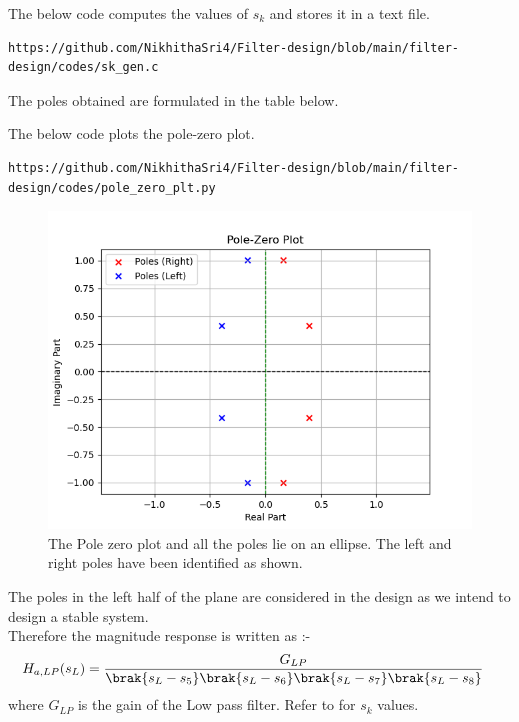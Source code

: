 \documentclass{article}
\begin{document}
\begin{enumerate}
The below code computes the values of $s_k$ and stores it in a text file. 
\begin{lstlisting}
https://github.com/NikhithaSri4/Filter-design/blob/main/filter-design/codes/sk_gen.c
\end{lstlisting}
The poles obtained are formulated in the table below.

The below code plots the pole-zero plot.
\begin{lstlisting}
https://github.com/NikhithaSri4/Filter-design/blob/main/filter-design/codes/pole_zero_plt.py
\end{lstlisting}
\begin{figure}[H]
\centering
\includegraphics[width=1\columnwidth]{figs/Pole_Zero_plt.png}
\caption{The Pole zero plot and all the poles lie on an ellipse. The left and right poles have been identified as shown.}
\label{fig:pole_zero_plt}
\end{figure}
The poles in the left half of the plane are considered in the design as we intend to design a stable system.\\
Therefore the magnitude response is written as :- 
\begin{align}
    H_{a,LP}(s_L) &= \frac{G_{LP}}{\brak{s_L-s_5}\brak{s_L-s_6}\brak{s_L-s_7}\brak{s_L-s_8}}
\end{align}
where $G_{LP}$ is the gain of the Low pass filter. Refer to  for $s_k$ values.\\


\end{enumerate}
\end{document}
